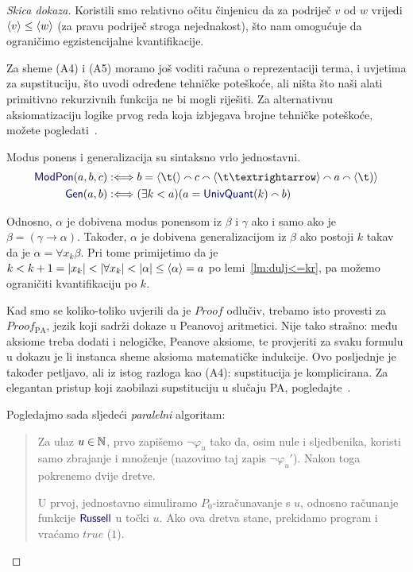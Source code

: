 \begin{proof}[Skica dokaza]
Koristili smo relativno očitu činjenicu da za podriječ $v$ od $w$ vrijedi $\langle v\rangle\le\langle w\rangle$ (za pravu podriječ stroga nejednakost), što nam omogućuje da ograničimo egzistencijalne kvantifikacije.

Za sheme (A4) i (A5) moramo još voditi računa o reprezentaciji terma, i uvjetima za supstituciju, što uvodi određene tehničke poteškoće, ali ništa što naši alati primitivno rekurzivnih funkcija ne bi mogli riješiti. Za alternativnu aksiomatizaciju logike prvog reda koja izbjegava brojne tehničke poteškoće, možete pogledati~\cite{smullyan}.

Modus ponens i generalizacija su sintaksno vrlo jednostavni.
\begin{align}
    \f{ModPon}(a,b,c)&:\Longleftrightarrow b=
    \kr{\t(}\conc{}
    c\conc{}
    \kr{\t\textrightarrow}\conc{}
    a\conc{}\kr{\t)}\\
    \f{Gen}(a,b)&:\Longleftrightarrow
    (\exists k<a)(a=\f{UnivQuant}(k)\conc{}b)
\end{align}

Odnosno, $\alpha$ je dobivena modus ponensom iz $\beta$ i $\gamma$ ako i samo ako je $\beta=(\gamma\to\alpha)$. Također, $\alpha$ je dobivena generalizacijom iz $\beta$ ako postoji $k$ takav da je $\alpha=\forall x_k\beta$. Pri tome primijetimo da je $k<k+1=\lvert x_k\rvert<\lvert\forall x_k\rvert<\lvert\alpha\rvert\le\langle\alpha\rangle=a$ po lemi~\ref{lm:dulj<=kr}, pa možemo ograničiti kvantifikaciju po $k$.

Kad smo se koliko-toliko uvjerili da je $Proof$ odlučiv, trebamo isto provesti za $Proof_{\text{PA}}$, jezik koji sadrži dokaze u Peanovoj aritmetici. Nije tako strašno: među aksiome treba dodati i nelogičke, Peanove aksiome, te provjeriti za svaku formulu u dokazu je li instanca sheme aksioma matematičke indukcije. Ovo posljednje je također petljavo, ali iz istog razloga kao (A4): supstitucija je komplicirana. Za elegantan pristup koji zaobilazi supstituciju u slučaju PA, pogledajte~\cite{smullyan}.

Pogledajmo sada sljedeći \emph{paralelni} algoritam:
\begin{quote}
    Za ulaz $u\in{\mathbb N}$, prvo zapišemo $\neg\varphi_u$ tako da, osim nule i sljedbenika, koristi samo zbrajanje i množenje (nazovimo taj zapis $\neg\varphi_u'$). Nakon toga pokrenemo dvije dretve. 
    
    U prvoj, jednostavno simuliramo $P_0$-izračunavanje s $u$, odnosno računanje funkcije $\f{Russell}$ u točki $u$. Ako ova dretva stane, prekidamo program i vraćamo $\mathit{true}$ ($1$).
    

\end{quote}
\end{proof}
